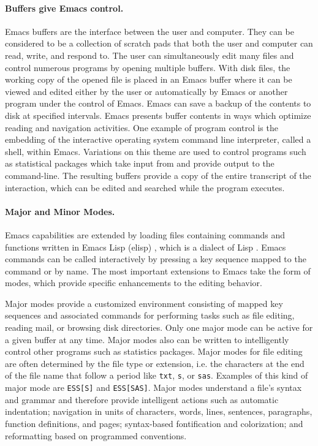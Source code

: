 \documentclass{article}
\newcommand{\stexttt}[1]{{\small\texttt{#1}}}
\begin{document}
\paragraph{Buffers give Emacs control.}
Emacs buffers are the interface between the user and computer.  They
can be considered to be a collection of scratch pads that both the
user and computer can read, write, and respond to.  The user can
simultaneously edit many files and control numerous programs by
opening multiple buffers.  With disk files, the working copy of the
opened file is placed in an Emacs buffer where it can be viewed and
edited either by the user or automatically by Emacs or another program
under the control of Emacs.  Emacs can save a backup of the contents
to disk at specified intervals.  Emacs presents buffer contents in
ways which optimize reading and navigation activities.  One example of
program control is the embedding of the interactive operating system
command line interpreter, called a shell, within Emacs.  Variations on
this theme are used to control programs such as statistical packages
which take input from and provide output to the command-line.  The
resulting buffers provide a copy of the entire transcript of the
interaction, which can be edited and searched while the program
executes.

\paragraph{Major and Minor Modes.}
Emacs capabilities are extended by loading 
files containing commands and functions written in Emacs Lisp (elisp)
\citep{RChassell1999}, which is a dialect of Lisp
\citep{PGraham:1996}.  Emacs commands can be called interactively by
pressing a key sequence mapped to the command or by name.
The most important extensions to Emacs take the form of modes, which
provide specific enhancements to the editing behavior.

Major modes provide a customized environment consisting of mapped key
sequences and associated commands for performing tasks such as file
editing, reading mail, or browsing disk directories.  Only one major
mode can be active for a given buffer at any time.  Major modes also
can be written to intelligently control other programs such as
statistics packages.  Major modes for file editing are often
determined by the file type or extension, i.e.  the characters at the
end of the file name that follow a period like \stexttt{txt},
\stexttt{s}, or \stexttt{sas}.  Examples of this kind of major mode are
\stexttt{ESS[S]} and \stexttt{ESS[SAS]}.  Major modes understand a
file's syntax and grammar and therefore provide intelligent
actions such as automatic indentation; navigation in units of
characters, words, lines, sentences, paragraphs, function definitions,
and pages; syntax-based fontification and colorization; and
reformatting based on programmed conventions.
\end{document}
